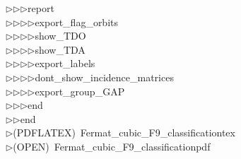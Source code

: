 \begin{tabbing}
$\triangleright$\>$\triangleright$\>$\triangleright$\>report\ \\[0pt]
$\triangleright$\>$\triangleright$\>$\triangleright$\>$\triangleright$\>export\_flag\_orbits\ \\[0pt]
$\triangleright$\>$\triangleright$\>$\triangleright$\>$\triangleright$\>show\_TDO\ \\[0pt]
$\triangleright$\>$\triangleright$\>$\triangleright$\>$\triangleright$\>show\_TDA\ \\[0pt]
$\triangleright$\>$\triangleright$\>$\triangleright$\>$\triangleright$\>export\_labels\ \\[0pt]
$\triangleright$\>$\triangleright$\>$\triangleright$\>$\triangleright$\>dont\_show\_incidence\_matrices\ \\[0pt]
$\triangleright$\>$\triangleright$\>$\triangleright$\>$\triangleright$\>export\_group\_GAP\ \\[0pt]
$\triangleright$\>$\triangleright$\>$\triangleright$\>end\ \\[0pt]
$\triangleright$\>$\triangleright$\>end\\[0pt]
$\triangleright$\>(PDFLATEX)\ Fermat\_cubic\_F9\_classificationtex\\[0pt]
$\triangleright$\>(OPEN)\ Fermat\_cubic\_F9\_classificationpdf\\[0pt]
\end{tabbing}
